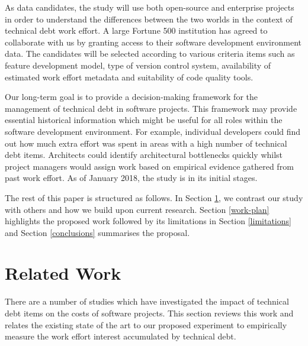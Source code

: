 As data candidates, the study will use both open-source and enterprise projects
in order to understand the differences between the two worlds in the context of
technical debt work effort. A large Fortune 500 institution has agreed to
collaborate with us by granting access to their software development environment
data. The candidates will be selected according to various criteria items such
as feature development model, type of version control system, availability of
estimated work effort metadata and suitability of code quality tools. 

Our long-term goal is to provide a decision-making framework for the management
of technical debt in software projects. This framework may provide essential
historical information which might be useful for all roles within the software
development environment. For example, individual developers could find out how
much extra effort was spent in areas with a high number of technical debt items.
Architects could identify architectural bottlenecks quickly whilst project
managers would assign work based on empirical evidence gathered from past work
effort. As of January 2018, the study is in its initial stages.

The rest of this paper is structured as follows.  In Section \ref{related-work},
we contrast our study with others and how we build upon current research.
Section \ref{work-plan} highlights the proposed work followed by its limitations
in Section \ref{limitations} and Section \ref{conclusions} summarises the
proposal.

\section{Related Work}
\label{related-work}

There are a number of studies which have investigated the impact of technical
debt items on the costs of software projects.  This section reviews this work
and relates the existing state of the art to our proposed experiment to
empirically measure the work effort interest accumulated by technical debt.


